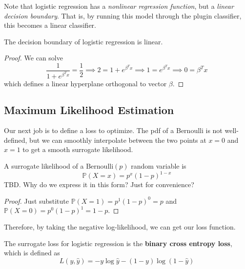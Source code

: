   Note that logistic regression has a \textit{nonlinear regression function}, but a \textit{linear decision boundary}. That is, by running this model through the plugin classifier, this becomes a linear classifier. 

  \begin{theorem}
    The decision boundary of logistic regression is linear. 
  \end{theorem}
  \begin{proof}
    We can solve 
    \begin{equation}
      \frac{1}{1 + e^{\beta^T x}} = \frac{1}{2} \implies 2 = 1 + e^{\beta^T x} \implies 1 = e^{\beta^T x} \implies 0 = \beta^T x
    \end{equation}
    which defines a linear hyperplane orthogonal to vector $\beta$. 
  \end{proof} 

\subsection{Maximum Likelihood Estimation} 

  Our next job is to define a loss to optimize. The pdf of a Bernoulli is not well-defined, but we can smoothly interpolate between the two points at $x = 0$ and $x = 1$ to get a smooth surrogate likelihood.  

  \begin{lemma}
    A surrogate likelihood of a $\mathrm{Bernoulli}(p)$ random variable is 
    \begin{equation}
      \mathbb{P}(X = x) = p^x (1 - p)^{1 - x}
    \end{equation} 
    TBD. Why do we express it in this form? Just for convenience? 
  \end{lemma} 
  \begin{proof}
    Just substitute $\mathbb{P}(X = 1) = p^1 (1 - p)^{0} = p$ and $\mathbb{P}(X = 0) = p^0 (1 - p)^1 = 1 - p$. 
  \end{proof}

  Therefore, by taking the negative log-likelihood, we can get our loss function. 

  \begin{definition}
    The surrogate loss for logistic regression is the \textbf{binary cross entropy loss}, which is defined as
    \begin{equation}
      L(y, \hat{y}) = -y \log \hat{y} - (1 - y) \log (1 - \hat{y})
    \end{equation}
  \end{definition}

